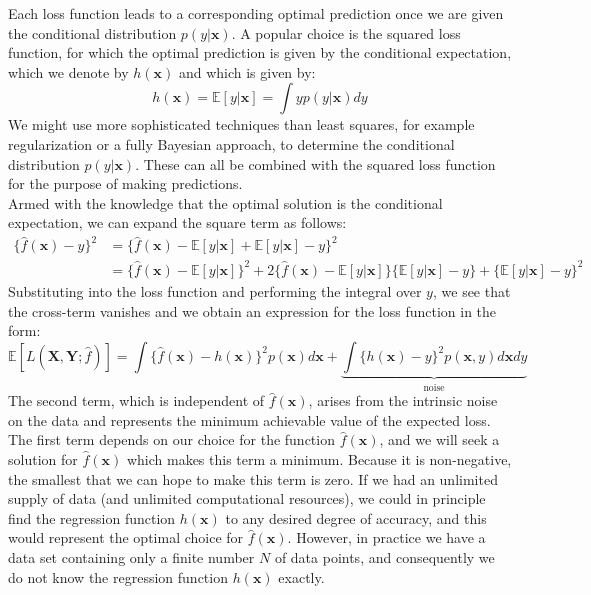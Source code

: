 \documentclass[twoside]{article}
\begin{document}
Each loss function leads to a corresponding optimal prediction once we are given the conditional distribution $p(y | \boldsymbol{x})$. A popular choice is the squared loss function, for which the optimal prediction is given by the conditional expectation, which we denote by $h(\boldsymbol{x})$ and which is given by:
\begin{equation*}
    h(\boldsymbol{x}) = \mathbb{E}[y | \boldsymbol{x}] = \int yp(y | \boldsymbol{x})dy
\end{equation*}
We might use more sophisticated techniques than least squares, for example regularization or a fully Bayesian approach, to determine the conditional distribution $p(y | \boldsymbol{x})$. These can all be combined with the squared loss function for the purpose of making predictions.\\
Armed with the knowledge that the optimal solution is the conditional expectation, we can expand the square term as follows:
\begin{equation*}
\begin{aligned}
    \{\hat{f}(\boldsymbol{x}) - y\}^2 &= \{\hat{f}(\boldsymbol{x}) - \mathbb{E}[y | \boldsymbol{x}] + \mathbb{E}[y | \boldsymbol{x}] - y\}^2\\
    &= \{\hat{f}(\boldsymbol{x}) - \mathbb{E}[y | \boldsymbol{x}]\}^2 + 2\{\hat{f}(\boldsymbol{x}) - \mathbb{E}[y | \boldsymbol{x}]\}\{\mathbb{E}[y | \boldsymbol{x}] - y\} + \{\mathbb{E}[y | \boldsymbol{x}] - y\}^2
\end{aligned}
\end{equation*}
Substituting into the loss function and performing the integral over $y$, we see that the cross-term vanishes and we obtain an expression for the loss function in the form:
\begin{equation}
    \mathbb{E}[L(\boldsymbol{X}, \boldsymbol{Y}; \hat{f})] = \int\{\hat{f}(\boldsymbol{x}) -
    h(\boldsymbol{x})\}^2p(\boldsymbol{x})d\boldsymbol{x} + \underbrace{\int\{ h(\boldsymbol{x}) - y\}^2p(\boldsymbol{x}, y)d\boldsymbol{x}dy}_\text{noise}
\end{equation}
The second term, which is independent of $\hat{f}(\boldsymbol{x})$, arises from the intrinsic noise on the data and represents the minimum achievable value of the expected loss. The first term depends on our choice for the function $\hat{f}(\boldsymbol{x})$, and we will seek a solution for $\hat{f}(\boldsymbol{x})$ which makes this term a minimum. Because it is non-negative, the smallest that we can hope to make this term is zero. If we had an unlimited supply of data (and unlimited computational resources), we could in principle find the regression function $h(\boldsymbol{x})$ to any desired degree of accuracy, and this would represent the optimal choice for $\hat{f}(\boldsymbol{x})$. However, in practice we have a data set containing only a finite number $N$ of data points, and consequently we do not know the regression function $h(\boldsymbol{x})$ exactly.\\
\end{document}
